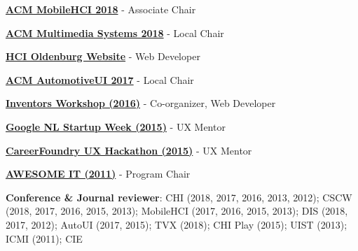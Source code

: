 \documentclass{article}
\newenvironment{innerlist}[1][\enskip\textbullet]%
        {\begin{compactenum}[#1]}{\end{compactenum}}
\begin{document}
\begin{innerlist}[-]

\item  {\textbf{\href{https://mobilehci.acm.org/2018/}{ACM MobileHCI 2018}} - Associate Chair} 

\item  {\textbf{\href{http://www.mmsys2018.org/}{ACM Multimedia Systems 2018}} - Local Chair} 

\item  {\textbf{\href{https://hci.uni-oldenburg.de/}{HCI Oldenburg Website}} - Web Developer} 

\item  {\textbf{\href{http://www.auto-ui.org/17/}{ACM AutomotiveUI 2017}} - Local Chair} 

\item  {\textbf{\href{http://iw2016.offis.de/}{Inventors Workshop (2016)}} - Co-organizer, Web Developer} 

\item  {\textbf{\href{https://events.withgoogle.com/google-nl-startup-week/}{Google NL Startup Week (2015)}} - UX Mentor} 

\item  {\textbf{\href{http://careerfoundry.com/}{CareerFoundry UX Hackathon (2015)}} - UX Mentor} 

\item  {\textbf{\href{http://congres.svia.nl/}{AWESOME IT (2011)}} -  Program Chair} 

\item \textbf{Conference \& Journal reviewer}: CHI (2018, 2017, 2016, 2013, 2012); CSCW (2018, 2017, 2016, 2015, 2013); MobileHCI (2017, 2016, 2015, 2013);  DIS (2018, 2017, 2012); AutoUI (2017, 2015); TVX (2018); CHI Play (2015); UIST (2013); ICMI (2011); CIE

\end{innerlist}
\end{document}
